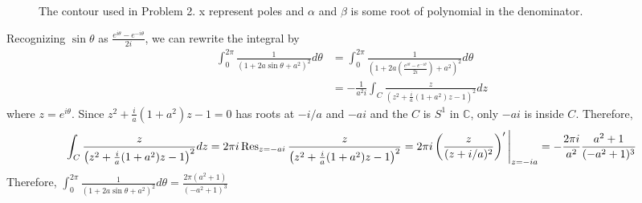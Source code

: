 \documentclass{article}
\begin{document}
\begin{figure}[h]
\centering
{}
\caption{The contour used in Problem 2. x represent poles and $\alpha$ and $\beta$ is some root of polynomial in the denominator.}
\label{Fig:P2}
\end{figure}
Recognizing $\sin\theta$ as $\frac{e^{i\theta}-e^{-i\theta}}{2i}$, we can rewrite the integral by
\begin{equation*}
\begin{split}
\int_0^{2\pi} \frac{1}{(1+2a\sin\theta+a^2)^2}d\theta&=\int_0^{2\pi} \frac{1}{\left(1+2a\left(\frac{e^{i\theta}-e^{-i\theta}}{2i}\right)+a^2\right)^2}d\theta\\
&=-\frac{1}{a^2i}\int_{C} \frac{z}{\left(z^2+\frac{i}{a}(1+a^2)z-1\right)^2}dz
\end{split}
\end{equation*}
where $z=e^{i\theta}$. Since $z^2+\frac{i}{a}(1+a^2)z-1=0$ has roots at $-i/a$ and $-ai$ and the $C$ is $S^1$ in $\mathbb{C}$, only $-ai$ is inside $C$. Therefore, 
\begin{equation*}
\int_{C} \frac{z}{\left(z^2+\frac{i}{a}(1+a^2)z-1\right)^2}dz=2\pi i\Res_{z=-ai}\frac{z}{\left(z^2+\frac{i}{a}(1+a^2)z-1\right)^2}=2\pi i\left(\frac{z}{(z+i/a)^2}\right)'\Bigg{|}_{z=-ia}=-\frac{2\pi i}{a^2}\frac{a^2+1}{(-a^2+1)^3}
\end{equation*}
Therefore, $\int_0^{2\pi} \frac{1}{(1+2a\sin\theta+a^2)^2}d\theta=\frac{2\pi(a^2+1)}{(-a^2+1)^3}$
\end{document}
